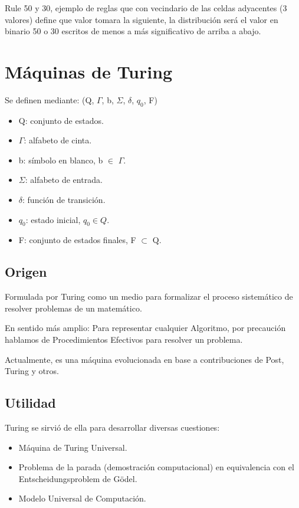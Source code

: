 Rule 50 y 30, ejemplo de reglas que con vecindario de las celdas adyacentes (3 valores) define que valor tomara la siguiente, la distribución será el valor en binario 50 o 30 escritos de menos a más significativo de arriba a abajo.

\section{Máquinas de Turing}
Se definen mediante: (Q, $\Gamma$, b, $\Sigma$, $\delta$, $q_0$, F)
\begin{itemize}
    \item Q: conjunto de estados.
    \item $\Gamma$: alfabeto de cinta.
    \item b: símbolo en blanco, b $\in$ $\Gamma$.
    \item $\Sigma$: alfabeto de entrada.
    \item $\delta$: función de transición.
    \item $q_0$: estado inicial, $q_0 \in Q$.
    \item F: conjunto de estados finales, F $\subset$ Q.
\end{itemize}

\subsection{Origen}
Formulada por Turing como un medio para formalizar el proceso sistemático de resolver problemas de un matemático.

En sentido más amplio: Para representar cualquier Algoritmo, por precaución hablamos de Procedimientos Efectivos para resolver un problema.

Actualmente, es una máquina evolucionada en base a contribuciones de Post, Turing y otros.

\subsection{Utilidad}
Turing se sirvió de ella para desarrollar diversas cuestiones: 
\begin{itemize}
    \item Máquina de Turing Universal.
    \item Problema de la parada (demostración computacional) en equivalencia con el Entscheidungsproblem de Gödel.
    \item Modelo Universal de Computación.
\end{itemize}

